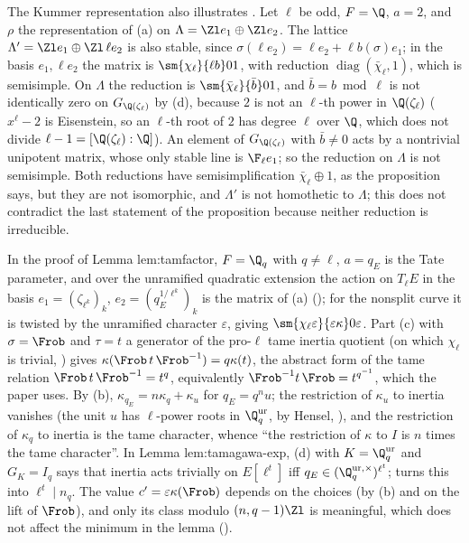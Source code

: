 The Kummer representation also illustrates . Let $\ell$ be odd, $F=\Q$, $a=2$, and $\rho$ the representation of (a) on
$\Lambda=\Zl e_1\oplus\Zl e_2$. The lattice $\Lambda'=\Zl e_1\oplus\Zl\,\ell e_2$ is also stable, since $\sigma(\ell e_2)=\ell e_2+\ell b(\sigma)e_1$; in the basis
$e_1,\ell e_2$ the matrix is $\sm{\chi_\ell}{\ell b}01$, with reduction $\operatorname{diag}(\bar\chi_\ell,1)$, which is semisimple. On $\Lambda$ the reduction is
$\sm{\bar\chi_\ell}{\bar b}01$, and $\bar b=b\bmod\ell$ is not identically zero on $G_{\Q(\zeta_\ell)}$ by (d), because $2$ is not an $\ell$-th power in $\Q(\zeta_\ell)$
($x^\ell-2$ is Eisenstein, so an $\ell$-th root of $2$ has degree $\ell$ over $\Q$, which does not divide $\ell-1=[\Q(\zeta_\ell):\Q]$). An element of
$G_{\Q(\zeta_\ell)}$ with $\bar b\ne0$ acts by a nontrivial unipotent matrix, whose only stable line is $\F_\ell e_1$; so the reduction on $\Lambda$ is not semisimple.
Both reductions have semisimplification $\bar\chi_\ell\oplus1$, as the proposition says, but they are not isomorphic, and $\Lambda'$ is not homothetic to $\Lambda$;
this does not contradict the last statement of the proposition because neither reduction is irreducible.

\begin{paperlink}
In the proof of Lemma lem:tamfactor, $F=\Q_q$ with $q\ne\ell$, $a=q_E$ is the Tate parameter, and over the unramified quadratic extension the action on $T_\ell E$ in the
basis $e_1=(\zeta_{\ell^k})_k$, $e_2=(q_E^{1/\ell^k})_k$ is the matrix of (a) (); for the nonsplit curve it is twisted by the unramified character
$\varepsilon$, giving $\sm{\chi_\ell\varepsilon}{\varepsilon\kappa}0\varepsilon$. Part (c) with $\sigma=\Frob$ and $\tau=t$ a generator of the pro-$\ell$ tame inertia quotient (on which
$\chi_\ell$ is trivial, ) gives $\kappa(\Frob\,t\,\Frob^{-1})=q\kappa(t)$, the abstract form of the tame relation $\Frob\,t\,\Frob^{-1}=t^q$, equivalently
$\Frob^{-1}t\,\Frob=t^{q^{-1}}$, which the paper uses. By (b), $\kappa_{q_E}=n\kappa_q+\kappa_u$ for $q_E=q^nu$; the restriction of $\kappa_u$ to inertia vanishes (the unit $u$
has $\ell$-power roots in $\Q_q^{\mathrm{ur}}$, by Hensel, ), and the restriction of $\kappa_q$ to inertia is the tame character, whence ``the restriction of $\kappa$
to $I$ is $n$ times the tame character''. In Lemma lem:tamagawa-exp, (d) with $K=\Q_q^{\mathrm{ur}}$ and $G_K=I_q$ says that inertia acts trivially on $E[\ell^t]$ iff
$q_E\in(\Q_q^{\mathrm{ur},\times})^{\ell^t}$;  turns this into $\ell^t\mid n_q$. The value $c'=\varepsilon\kappa(\Frob)$ depends on the choices (by (b) and on
the lift of $\Frob$), and only its class modulo $(n,q-1)\Zl$ is meaningful, which does not affect the minimum in the lemma ().
\end{paperlink}

